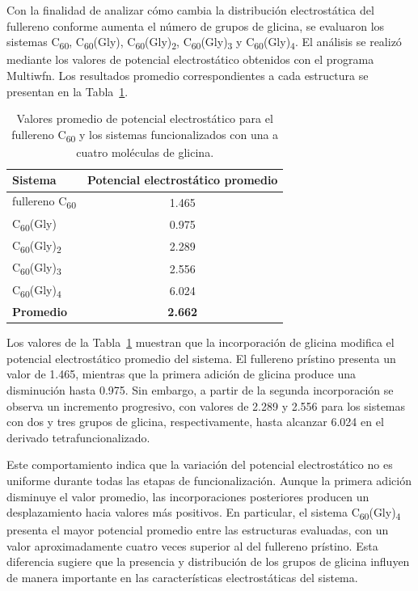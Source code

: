 Con la finalidad de analizar cómo cambia la distribución electrostática del fullereno conforme aumenta el número de grupos de glicina, se evaluaron los sistemas C\textsubscript{60}, C\textsubscript{60}(Gly), C\textsubscript{60}(Gly)\textsubscript{2}, C\textsubscript{60}(Gly)\textsubscript{3} y C\textsubscript{60}(Gly)\textsubscript{4}. El análisis se realizó mediante los valores de potencial electrostático obtenidos con el programa Multiwfn. Los resultados promedio correspondientes a cada estructura se presentan en la Tabla~\ref{tab:potencial-electrostatico}.

\begin{table}[H]
    \centering
    \caption{Valores promedio de potencial electrostático para el fullereno C\textsubscript{60} y los sistemas funcionalizados con una a cuatro moléculas de glicina.}
    \label{tab:potencial-electrostatico}
    \renewcommand{\arraystretch}{1.15}
    \begin{tabular}{lc}
        \toprule
        \textbf{Sistema} & \textbf{Potencial electrostático promedio} \\
        \midrule
        fullereno C\textsubscript{60} & 1.465 \\
        C\textsubscript{60}(Gly) & 0.975 \\
        C\textsubscript{60}(Gly)\textsubscript{2} & 2.289 \\
        C\textsubscript{60}(Gly)\textsubscript{3} & 2.556 \\
        C\textsubscript{60}(Gly)\textsubscript{4} & 6.024 \\
        \midrule
        \textbf{Promedio} & \textbf{2.662} \\
        \bottomrule
    \end{tabular}
\end{table}

Los valores de la Tabla~\ref{tab:potencial-electrostatico} muestran que la incorporación de glicina modifica el potencial electrostático promedio del sistema. El fullereno prístino presenta un valor de 1.465, mientras que la primera adición de glicina produce una disminución hasta 0.975. Sin embargo, a partir de la segunda incorporación se observa un incremento progresivo, con valores de 2.289 y 2.556 para los sistemas con dos y tres grupos de glicina, respectivamente, hasta alcanzar 6.024 en el derivado tetrafuncionalizado.

Este comportamiento indica que la variación del potencial electrostático no es uniforme durante todas las etapas de funcionalización. Aunque la primera adición disminuye el valor promedio, las incorporaciones posteriores producen un desplazamiento hacia valores más positivos. En particular, el sistema C\textsubscript{60}(Gly)\textsubscript{4} presenta el mayor potencial promedio entre las estructuras evaluadas, con un valor aproximadamente cuatro veces superior al del fullereno prístino. Esta diferencia sugiere que la presencia y distribución de los grupos de glicina influyen de manera importante en las características electrostáticas del sistema.

